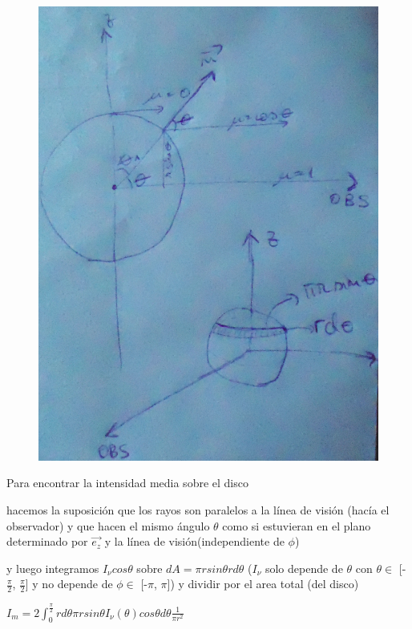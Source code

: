 \documentclass[10pt]{book}
\begin{document}
\begin{figure}[!ht]
 \centering
 \includegraphics[scale=0.2]{p2s.png}
\end{figure}


Para encontrar la intensidad media sobre el disco 

hacemos la suposición que los rayos son paralelos a la línea de visión (hacía el observador) y que hacen el mismo ángulo $\theta$ 
como si estuvieran en el plano determinado por $\vec{e_z}$ y la línea de visión(independiente de $\phi$)

y luego integramos $I_{\nu} cos \theta$ sobre $dA = \pi r sin \theta r d\theta$ 
($I_{\nu}$ solo depende de $\theta$ con $\theta \in$ [-$\frac{\pi}{2}$, $\frac{\pi}{2}$] y
no depende de $\phi \in$ [-$\pi$, $\pi$]) y dividir por el area total (del disco)  

$I_m = 2 \int_{0}^{\frac{\pi}{2}} {r d\theta \pi r sin \theta I_{\nu}(\theta) cos \theta d\theta} \frac{1}{\pi r^2}$
\end{document}
